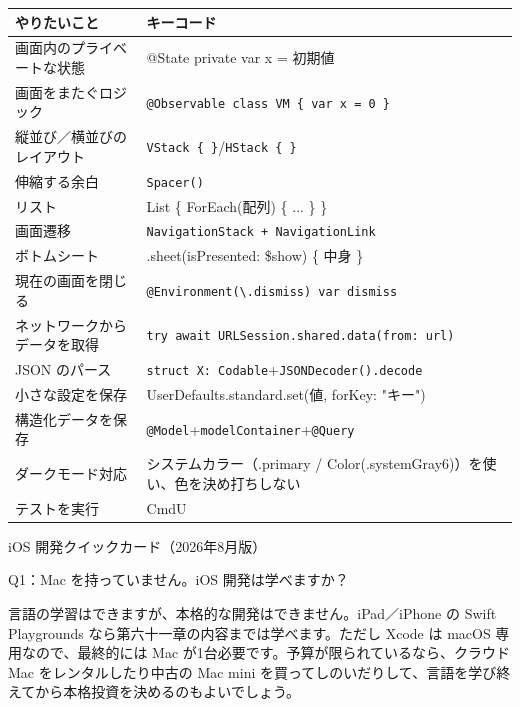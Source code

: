


\begin{center}
\begin{tabularx}{\linewidth}{|X|X|}
\hline
\textbf{やりたいこと} & \textbf{キーコード} \tabularnewline
\hline
画面内のプライベートな状態 & @State private var x = 初期値 \tabularnewline
画面をまたぐロジック & \texttt{@Observable class VM \{ var x = 0 \}} \tabularnewline
縦並び／横並びのレイアウト & \texttt{VStack \{ \}}/\texttt{HStack \{ \}} \tabularnewline
伸縮する余白 & \texttt{Spacer()} \tabularnewline
リスト & List \{ ForEach(配列) \{ ... \} \} \tabularnewline
画面遷移 & \texttt{NavigationStack + NavigationLink} \tabularnewline
ボトムシート & .sheet(isPresented: \$show) \{ 中身 \} \tabularnewline
現在の画面を閉じる & \texttt{@Environment(\textbackslash{}.\allowbreak dismiss) var dismiss} \tabularnewline
ネットワークからデータを取得 & \texttt{try await URLSession.\allowbreak shared.\allowbreak data(from: url)} \tabularnewline
JSON のパース & \texttt{struct X: Codable}+\texttt{JSONDecoder().\allowbreak decode} \tabularnewline
小さな設定を保存 & UserDefaults.standard.set(値, forKey: "キー") \tabularnewline
構造化データを保存 & \texttt{@Model}+\texttt{modelContainer}+\texttt{@Query} \tabularnewline
ダークモード対応 & システムカラー（.primary / Color(.systemGray6)）を使い、色を決め打ちしない \tabularnewline
テストを実行 & CmdU \tabularnewline
\hline
\end{tabularx}
\end{center}

\begin{center}\small\color{gray}iOS 開発クイックカード（2026年8月版）\end{center}


Q1：Mac を持っていません。iOS 開発は学べますか？

言語の学習はできますが、本格的な開発はできません。iPad／iPhone の Swift Playgrounds なら第六十一章の内容までは学べます。ただし Xcode は macOS 専用なので、最終的には Mac が1台必要です。予算が限られているなら、クラウド Mac をレンタルしたり中古の Mac mini を買ってしのいだりして、言語を学び終えてから本格投資を決めるのもよいでしょう。

